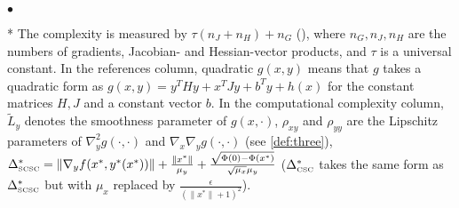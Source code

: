 \documentclass{osudissert96}
\begin{document}
\begin{table*}[!t]
\vspace{0.2cm}
 {\small
\begin{list}{$\bullet$}{\topsep=0.1in \leftmargin=0.2in \rightmargin=0.1in \itemsep =0.01in}
\item[*] The complexity is measured by $\tau (n_J+n_H) + n_G$ (), where $n_G, n_J,n_H$ are the numbers of gradients, Jacobian- and Hessian-vector products, and $\tau$ is a universal constant. 
In the references column, quadratic $g(x,y)$ means that $g$ takes a quadratic form as {\scriptsize $g(x,y)=y^T H y +  x^T J y + b^Ty+h(x)$} for the constant matrices $H,J$ and a constant vector $b$.
In the computational complexity column, $\widetilde L_y$ denotes the smoothness parameter of $g(x,\cdot)$, $\rho_{xy}$ and $\rho_{yy}$ are the Lipschitz parameters of {\scriptsize $\nabla_y^2g(\cdot,\cdot)$} and {\small$\nabla_x\nabla_yg(\cdot,\cdot)$} (see \cref{def:three}), {\scriptsize $\Delta^*_{\text{\normalfont\tiny SCSC}}=\|\nabla_y f( x^*,y^*(x^*))\|+\frac{\|x^*\|}{\mu_y}+\frac{\sqrt{\Phi(0)-\Phi(x^*)}}{\sqrt{\mu_x}\mu_y}$} ($\Delta^*_{\text{\normalfont\tiny CSC}}$ takes the same form as $\Delta^*_{\text{\normalfont\tiny SCSC}}$ but with $\mu_x$ replaced by {\scriptsize $\frac{\epsilon}{(\|x^*\|+1)^2}$}). %
\end{list}
}
\vspace{-0.5cm}
\end{table*}
\end{document}
